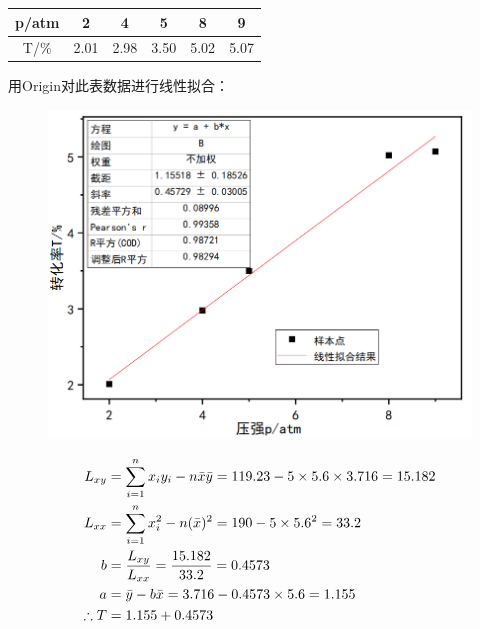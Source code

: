 \documentclass[UTF8]{ctexart}
\begin{document}
\begin{center}
\begin{tabular}{cccccc}
\toprule
p/atm&2&4&5&8&9\\ 
\midrule
T/$\%$ & 2.01&2.98  &3.50  &5.02  &5.07\\
\bottomrule
\end{tabular}
\end{center}
\par 用Origin对此表数据进行线性拟合：
\begin{figure}[H]
\begin{center}
\includegraphics[height=20\baselineskip]{FIG/N2.png}
\end{center}
\end{figure}

\begin{equation}
\begin{aligned}\notag 
L_{xy}&=\sum\limits_{i=1}^nx_{i}y_{i}-n\bar{x}\bar{y}=119.23-5\times5.6\times3.716=15.182\\
L_{xx}&={\sum\limits_{i=1}^nx_{i}^{2}-n(\bar{x})^2}=190-5\times5.6^{2}=33.2\\
b&=\frac{L_{xy}}{L_{xx}}=\frac{15.182}{33.2}=0.4573\\
a&=\bar{y}-b\bar{x}=3.716-0.4573\times5.6=1.155\\
\therefore T&=1.155+0.4573\\
\end{aligned}
\end{equation}
\end{document}
